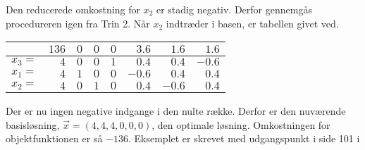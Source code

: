 \begin{eks}
\begin{center}
\end{center}
Den reducerede omkostning for $x_2$ er stadig negativ. Derfor gennemgås procedureren igen fra Trin 2. Når $x_2$ indtræder i basen, er tabellen givet ved. 
\begin{center}
\begin{tabular}{|r| r|r r r r r r|}
  \hline	
  &$136$&$0$ &$0$&$0$&$3.6$&$1.6$&$1.6$\\ \hline	
  $x_3=$&$4$&$0$&$0$&$1$&$0.4$&$0.4$&$-0.6$\\	
  $x_1=$&$4$&$1$&$0$&$0$&$-0.6$&$0.4$&$0.4$\\
  $x_2=$&$4$&$0$&$1$&$0$&$0.4$&$-0.6$&$0.4$\\
   \hline
\end{tabular}
\end{center}
Der er nu ingen negative indgange i den nulte række. Derfor er den nuværende basisløsning, $\vec{x}=(4,4,4,0,0,0)$, den optimale løsning. Omkostningen for objektfunktionen er så $-136$. Eksemplet er skrevet med udgangspunkt i side 101 i \citep{bert}
\end{eks}

